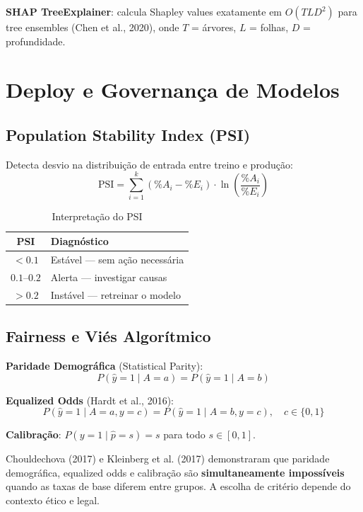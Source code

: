 \documentclass[12pt,a4paper,twoside]{book}
\theoremstyle{definition}
\theoremstyle{remark}
\begin{document}
\textbf{SHAP TreeExplainer}: calcula Shapley values exatamente em $O(TLD^2)$ para tree ensembles (Chen et al., 2020), onde $T$ = árvores, $L$ = folhas, $D$ = profundidade.

\chapter{Deploy e Governança de Modelos}

\section{Population Stability Index (PSI)}

Detecta desvio na distribuição de entrada entre treino e produção:
\[
\mathrm{PSI} = \sum_{i=1}^{k} (\%A_i - \%E_i) \cdot \ln\!\left(\frac{\%A_i}{\%E_i}\right)
\]

\begin{table}[H]
\centering
\caption{Interpretação do PSI}
\begin{tabular}{cl}
\toprule
\textbf{PSI} & \textbf{Diagnóstico} \\
\midrule
$< 0.1$ & Estável — sem ação necessária \\
$0.1$--$0.2$ & Alerta — investigar causas \\
$> 0.2$ & Instável — retreinar o modelo \\
\bottomrule
\end{tabular}
\end{table}

\section{Fairness e Viés Algorítmico}

\textbf{Paridade Demográfica} (Statistical Parity):
\[
P(\hat{y}=1 \mid A=a) = P(\hat{y}=1 \mid A=b)
\]

\textbf{Equalized Odds} (Hardt et al., 2016):
\[
P(\hat{y}=1 \mid A=a, y=c) = P(\hat{y}=1 \mid A=b, y=c), \quad c \in \{0,1\}
\]

\textbf{Calibração}: $P(y=1 \mid \hat{p} = s) = s$ para todo $s \in [0,1]$.

\begin{tcolorbox}[alertbox,title=Impossibilidade de Fairness]
Chouldechova (2017) e Kleinberg et al. (2017) demonstraram que paridade demográfica, equalized odds e calibração são \textbf{simultaneamente impossíveis} quando as taxas de base diferem entre grupos. A escolha de critério depende do contexto ético e legal.
\end{tcolorbox}
\end{document}
